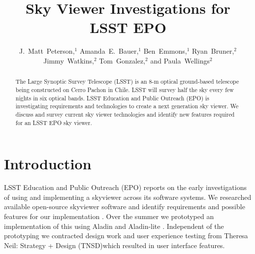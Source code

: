 \documentclass[11pt,twoside]{article}
\begin{document}
\title{Sky Viewer Investigations for LSST EPO}

\author{J.~Matt~Peterson,$^1$ Amanda~E.~Bauer,$^1$ Ben~Emmons,$^1$ Ryan~Bruner,$^2$ Jimmy~Watkins,$^2$ Tom~Gonzalez,$^2$ and Paula~Wellings$^2$}


\begin{abstract}
The Large Synoptic Survey Telescope (LSST) is an 8-m optical ground-based telescope being constructed on Cerro Pachon in Chile. LSST will survey half the sky every few nights in six optical bands. LSST Education and Public Outreach (EPO) is investigating requirements and technologies to create a next generation sky viewer. We discuss and survey current sky viewer technologies and identify new features required for an LSST EPO sky viewer.
\end{abstract}

\section{Introduction}
LSST Education and Public Outreach (EPO) reports on the early investigations of using and implementing a skyviewer across its software systems. We researched available open-source skyviewer software and identify requirements and possible features for our implementation \citep{2017LSST.1.LSE-89,2017LSST.1.LEP-31}. Over the summer we prototyped an implementation of this using Aladin and Aladin-lite \citep{2014ASPC..485..277B}. Independent of the prototyping we contracted design work and user experience testing from Theresa Neil: Strategy + Design (TNSD)\footnotemark[1] which resulted in user interface features.
\end{document}
